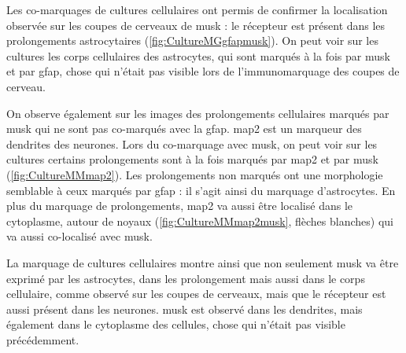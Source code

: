 	Les co-marquages de cultures cellulaires ont permis de confirmer la localisation observée sur les coupes de cerveaux de \gls{musk} : le récepteur est présent dans les prolongements astrocytaires (\cref{fig:CultureMGgfapmusk}). On peut voir sur les cultures les corps cellulaires des astrocytes, qui sont marqués à la fois par \gls{musk} et par \gls{gfap}, chose qui n'était pas visible lors de l'immunomarquage des coupes de cerveau.
	
	On observe également sur les images des prolongements cellulaires marqués par \gls{musk} qui ne sont pas co-marqués avec la \gls{gfap}. \gls{map2} est un marqueur des dendrites des neurones. Lors du co-marquage avec \gls{musk}, on peut voir sur les cultures certains prolongements sont à la fois marqués par \gls{map2} et par \gls{musk} (\cref{fig:CultureMMmap2}). Les prolongements non marqués ont une morphologie semblable à ceux marqués par \gls{gfap} : il s'agit ainsi du marquage d'astrocytes. En plus du marquage de prolongements, \gls{map2} va aussi être localisé dans le cytoplasme, autour de noyaux (\cref{fig:CultureMMmap2musk}, flèches blanches) qui va aussi co-localisé avec \gls{musk}. 
	
	La marquage de cultures cellulaires montre ainsi que non seulement \gls{musk} va être exprimé par les astrocytes, dans les prolongement mais aussi dans le corps cellulaire, comme observé sur les coupes de cerveaux, mais que le récepteur est aussi présent dans les neurones. \Gls{musk} est observé dans les dendrites, mais également dans le cytoplasme des cellules, chose qui n'était pas visible précédemment.
	

